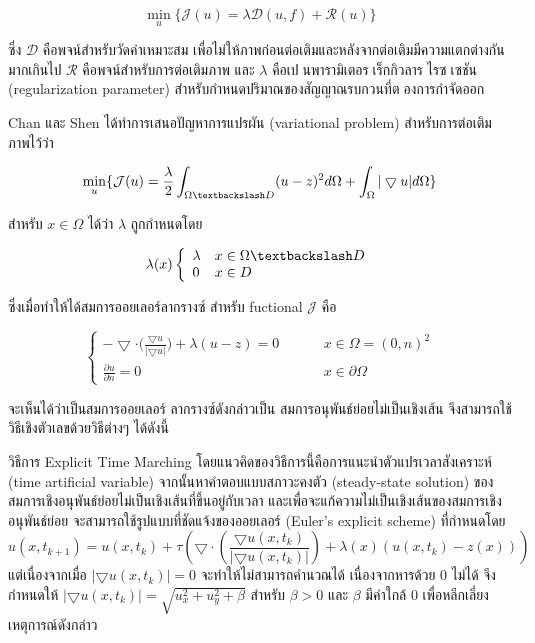 \documentclass[hidelinks,a4paper,14pt]{article}
\numberwithin{equation}{section}							%
\begin{document}
{$$\min_{u} \{ \mathcal{J}(u)= \lambda \mathcal{D}(u,f)+  \mathcal{R}(u) \}$$

ซึ่ง $ \mathcal{D} $ คือพจน์สำหรับวัดค่าเหมาะสม เพื่อไม่ให้ภาพก่อนต่อเติมและหลังจากต่อเติมมีความแตกต่างกันมากเกินไป $ \mathcal{R} $ คือพจน์สำหรับการต่อเติมภาพ และ $ \lambda $  คือเปนพารามิเตอรเร็กกิวลารไรซเซชัน (regularization parameter) สำหรับกำหนดปริมาณของสัญญาณรบกวนที่ตองการกำจัดออก 

\hspace{1cm} Chan และ Shen ได้ทำการเสนอปัญหาการแปรผัน (variational problem) สำหรับการต่อเติมภาพไว้ว่า

$$\min_{u} \{ \mathcal{J}(u) = \frac{\lambda}{2} \int_{\Omega \textbackslash D} (u-z)^2 d\Omega +  \int_{\Omega}  |\bigtriangledown u|  d\Omega \}$$

สำหรับ $x \in \Omega$ ได้ว่า $\lambda$ ถูกกำหนดโดย

$$ \lambda(x) \left \{ \begin{array}{ll}  \lambda & x \in \Omega \textbackslash D \\ 0 & x \in D  \end{array} \right . $$

ซึ่งเมื่อทำให้ได้สมการออยเลอร์ลากรางซ์ สำหรับ fuctional $\mathcal{J}$ คือ 

$$ \left \{ \begin{array}{ll}  - \bigtriangledown \cdot  \Big( \frac{\bigtriangledown u}{|\bigtriangledown u|} \Big) + \lambda (u-z) = 0  & \hspace{1cm} x \in \Omega = (0,n)^2 \\ \frac{\partial u}{\partial n} = 0 & \hspace{1cm} x \in \partial \Omega \end{array} \right . $$

จะเห็นได้ว่าเป็นสมการออยเลอร์ ลากรางซ์ดังกล่าวเป็น สมการอนุพันธ์ย่อยไม่เป็นเชิงเส้น จึงสามารถใช้วิธีเชิงตัวเลขด้วยวิธีต่างๆ ได้ดังนี้

\hspace{1cm}วิธีการ Explicit Time Marching  \cite{ref:ExplicitTimeMarching}  โดยแนวคิดของวิธีการนี้คือการแนะนําตัวแปรเวลาสังเคราะห์ (time artificial variable) จากนั้นหาคําตอบแบบสภาวะคงตัว (steady-state solution) ของสมการเชิงอนุพันธ์ย่อยไม่เป็นเชิงเส้นที่ขึ้นอยู่กับเวลา และเพื่อจะแก้ความไม่เป็นเชิงเส้นของสมการเชิงอนุพันธ์ย่อย จะสามารถใช้รูปแบบที่ชัดแจ้งของออยเลอร์ (Euler's explicit scheme) ที่กำหนดโดย
$$
u(x,t_{k+1})=u(x,t_{k})+\tau\left(\bigtriangledown \cdot\left(\frac{\bigtriangledown u (x,t_k)}{| \bigtriangledown u (x,t_k) | }\right) + \lambda(x)(u (x,t_k)-z(x)) \right)
$$
แต่เนื่องจากเมื่อ $| \bigtriangledown u ( x,t_k) \rvert = 0 $ จะทำให้ไม่สามารถคำนวณได้ เนื่องจากหารด้วย 0 ไม่ได้ จึงกำหนดให้ $| \bigtriangledown u (x,t_k) | = \sqrt{u_x^2+u_y^2 + \beta}$ สำหรับ $\beta > 0$ และ $\beta$ มีค่าใกล้ 0 เพื่อหลีกเลี่ยงเหตุการณ์ดังกล่าว

}
\end{document}
